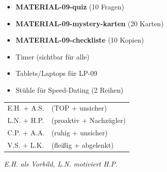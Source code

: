 \documentclass[11pt, a4paper]{article}
\begin{document}
\begin{minipage}[t]{0.48\textwidth}
\begin{tcolorbox}[
    colback=hellgrau,
    colframe=phase,
    title={\footnotesize\bfseries Material-Checkliste},
    fonttitle=\bfseries,
    boxrule=0.5pt,
    top=2pt, bottom=2pt, left=4pt, right=4pt
]
\footnotesize
\begin{itemize}
\item[$\square$] \textbf{MATERIAL-09-quiz} (10 Fragen)
\item[$\square$] \textbf{MATERIAL-09-mystery-karten} (20 Karten)
\item[$\square$] \textbf{MATERIAL-09-checkliste} (10 Kopien)
\item[$\square$] Timer (sichtbar für alle)
\item[$\square$] Tablets/Laptops für LP-09
\item[$\square$] Stühle für Speed-Dating (2 Reihen)
\end{itemize}
\end{tcolorbox}
\end{minipage}
\hfill
\begin{minipage}[t]{0.48\textwidth}
\begin{tcolorbox}[
    colback=gamification!10,
    colframe=gamification,
    title={\footnotesize\bfseries Tandem-Zuordnung (Phase 4)},
    fonttitle=\bfseries,
    boxrule=0.5pt,
    top=2pt, bottom=2pt, left=4pt, right=4pt
]
\footnotesize
\begin{tabular}{@{}ll@{}}
\textcolor{gruppeA}{E.H.} + \textcolor{gruppeB}{A.S.} & (TOP + unsicher) \\
\textcolor{gruppeA}{L.N.} + \textcolor{gruppeB}{H.P.} & (proaktiv + Nachzügler) \\
\textcolor{gruppeA}{C.P.} + \textcolor{gruppeB}{A.A.} & (ruhig + unsicher) \\
\textcolor{gruppeA}{V.S.} + \textcolor{gruppeA}{L.K.} & (fleißig + abgelenkt) \\
\end{tabular}

\vspace{0.1cm}
\textit{E.H. als Vorbild, L.N. motiviert H.P.}
\end{tcolorbox}
\end{minipage}

\vspace{0.2cm}

\end{document}
